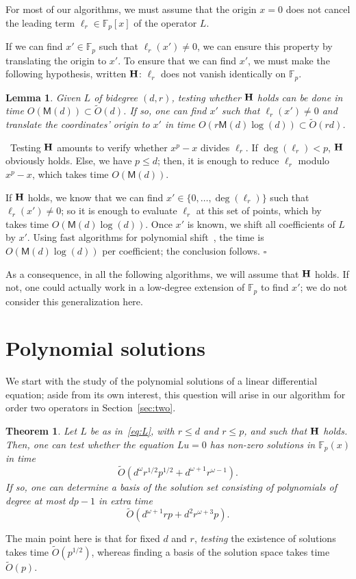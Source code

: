 \documentclass{sig-alternate}
\newcommand{\bigOsoft}{\tilde{O}}
\def\F {\mathbb{F}}
\def\M{\ensuremath{\mathsf{M}}}
\def\myproof{\noindent{\sc Proof.}~}
\def\foorp{\hfill$\square$}
\newtheorem{theorem}{Theorem}
\newtheorem{Lemma}{Lemma}
\begin{document}
\smallskip{} For most of our algorithms,
we must assume that the origin $x=0$ does not cancel the leading term
$\ell_r \in \F_p[x]$ of the operator $L$. 

If we can find $x' \in \F_p$ such that $\ell_r(x') \ne 0$, we can
ensure this property by translating the origin to $x'$. To ensure that
we can find $x'$, we must make the following hypothesis, written ${\bf
  H}$: $\ell_r$ does not vanish identically on $\F_p$.
\begin{Lemma}
  Given $L$ of bidegree $(d,r)$, testing whether ${\bf H}$ holds
  can be done in time $O(\M(d)) \subset \bigOsoft(d)$. If so, one can find $x'$
  such that $\ell_r(x') \ne 0$ and translate the coordinates' origin
  to $x'$ in time $O(r\M(d)\log(d)) \subset \bigOsoft(rd)$.
\end{Lemma}
\myproof Testing ${\bf H}$ amounts to verify whether $x^p-x$ divides
$\ell_r$. If $\deg(\ell_r) < p$, $\bf H$ obviously holds. Else, we
have $p \le d$; then, it is enough to reduce $\ell_r$ modulo $x^p-x$, which
takes time $O(\M(d))$.

If $\bf H$ holds, we know that we can find $x' \in \{0,\dots,\deg(\ell_r)\}$ such that $\ell_r(x')
\ne 0$; so it is enough to evaluate
$\ell_r$ at this set of points, which by~\cite[\S 10.1]{GaGe99} takes time
$O(\M(d)\log(d))$. Once $x'$ is known, we shift all coefficients of
$L$ by $x'$. Using fast algorithms for polynomial shift~\cite{GaGe97},
the time is $O(\M(d)\log(d))$ per coefficient; the conclusion follows.
\foorp

\smallskip\noindent As a consequence, in all the following algorithms, we
will assume that ${\bf H}$ holds. If not, one could actually work in a
low-degree extension of $\F_p$ to find $x'$; we do not consider this 
generalization here.




\section{Polynomial solutions}\label{sec:solpol}

\noindent We start with the study of the polynomial solutions of a
linear differential equation; aside from its own interest, this
question will arise in our algorithm for order two operators in
Section~\ref{sec:two}. 
\begin{theorem}\label{coro:solpol}
  Let $L$ be as in~\eqref{eq:L}, with $r \le d$ and $r \le p$, and such
  that ${\bf H}$ holds. Then, one can test whether the equation $Lu=0$
  has non-zero solutions in $\F_p(x)$ in time
  $$\bigOsoft(d^\omega r^{1/2} p^{1/2}+ d^{\omega+1}r^{\omega-1}).$$ 
  If so, one can determine a basis of the solution set consisting of
  polynomials of degree at most $dp-1$ in extra time
$$\bigOsoft(d^{\omega+1}rp + d^2 r^{\omega+3} p).$$
\end{theorem}
\noindent The main point here is that for fixed $d$ and $r$, {\em
  testing} the existence of solutions takes time
$\bigOsoft(p^{1/2})$, whereas finding a basis of the solution space
takes time $\bigOsoft(p)$.
\end{document}

